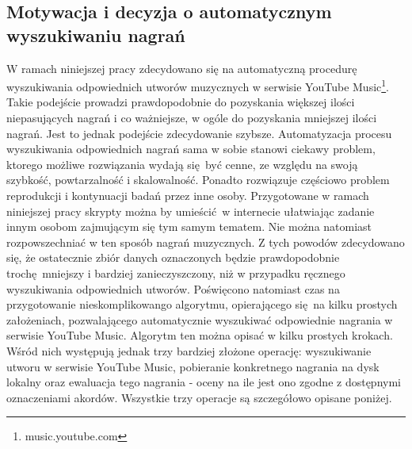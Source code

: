 \subsection{Motywacja i decyzja o automatycznym wyszukiwaniu nagrań}
W ramach niniejszej pracy zdecydowano się na automatyczną procedurę wyszukiwania odpowiednich
utworów muzycznych w serwisie YouTube Music\footnote{music.youtube.com}. Takie podejście prowadzi
prawdopodobnie do pozyskania większej ilości niepasujących nagrań i co ważniejsze, w ogóle do
pozyskania mniejszej ilości nagrań. Jest to jednak podejście zdecydowanie szybsze. Automatyzacja
procesu wyszukiwania odpowiednich nagrań sama w sobie stanowi ciekawy problem, ktorego możliwe
rozwiązania wydają się być cenne, ze względu na swoją szybkość, powtarzalność i skalowalność.
Ponadto rozwiązuje częściowo problem reprodukcji i kontynuacji badań przez inne osoby.  Przygotowane
w ramach niniejszej pracy skrypty można by umieścić w internecie ułatwiając zadanie innym osobom
zajmującym się tym samym tematem. Nie można natomiast rozpowszechniać w ten sposób nagrań
muzycznych. Z tych powodów zdecydowano się, że ostatecznie zbiór danych oznaczonych będzie
prawdopodobnie trochę mniejszy i bardziej zanieczyszczony, niż w przypadku ręcznego wyszukiwania
odpowiednich utworów. Poświęcono natomiast czas na przygotowanie nieskomplikowango algorytmu,
opierającego się na kilku prostych założeniach, pozwalającego automatycznie wyszukiwać odpowiednie
nagrania w serwisie YouTube Music. Algorytm ten można opisać w kilku prostych krokach. Wśród nich
występują jednak trzy bardziej złożone operację: wyszukiwanie utworu w serwisie YouTube Music,
pobieranie konkretnego nagrania na dysk lokalny oraz ewaluacja tego nagrania - oceny na ile jest ono
zgodne z dostępnymi oznaczeniami akordów. Wszystkie trzy operacje są szczegółowo opisane poniżej.

